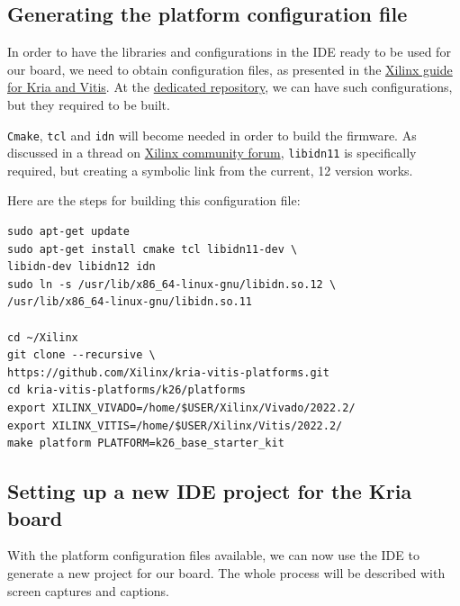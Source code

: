 \documentclass[10pt]{article}
\begin{document}
\subsection{Generating the platform configuration file}
\label{sec:gener-platf-conf}
In order to have the libraries and configurations in the IDE ready to be used for our board, we need to obtain configuration files, as presented in the 
\href{https://xilinx.github.io/kria-apps-docs/kv260/2022.1/build/html/docs/build_vitis_platform.html?highlight=xsa}{Xilinx guide for Kria and Vitis}. At the \href{https://github.com/Xilinx/kria-vitis-platforms}{dedicated repository}, we can have such configurations, but they required to be built.

\verb|Cmake|, \verb|tcl| and \verb|idn| will become needed in order to build the firmware.
As discussed in a thread on \href{https://support.xilinx.com/s/question/0D52E00006jrzsYSAQ/platform-project-cannot-be-created-on-vitis?language=en\_US}{Xilinx community forum}, \verb|libidn11| is specifically required, but creating a symbolic link from the current, 12 version works.

Here are the steps for building this configuration file:
\begin{tcolorbox}
\begin{verbatim}
sudo apt-get update
sudo apt-get install cmake tcl libidn11-dev \
libidn-dev libidn12 idn
sudo ln -s /usr/lib/x86_64-linux-gnu/libidn.so.12 \
/usr/lib/x86_64-linux-gnu/libidn.so.11

cd ~/Xilinx
git clone --recursive \
https://github.com/Xilinx/kria-vitis-platforms.git
cd kria-vitis-platforms/k26/platforms
export XILINX_VIVADO=/home/$USER/Xilinx/Vivado/2022.2/
export XILINX_VITIS=/home/$USER/Xilinx/Vitis/2022.2/
make platform PLATFORM=k26_base_starter_kit
\end{verbatim}
\end{tcolorbox}


\subsection{Setting up a new IDE project for the Kria board}
\label{sec:setting-up-new}
With the platform configuration files available, we can now use the IDE to generate a
new project for our board. The whole process will be described with screen captures and
captions.
\end{document}
